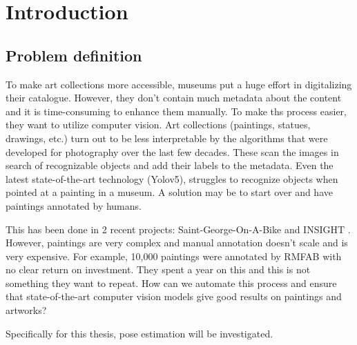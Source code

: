 \chapter{Introduction}
\label{chap:intro}

\section{Problem definition}

To make art collections more accessible, museums put a huge effort in digitalizing their catalogue.
However, they don't contain much metadata about the content and it is time-consuming to enhance them manually.
To make ths process easier, they want to utilize computer vision.
Art collections (paintings, statues, drawings, etc.) turn out to be less interpretable by the algorithms that were developed for photography over the last few decades.
These scan the images in search of recognizable objects and add their labels to the metadata.
Even the latest state-of-the-art technology (Yolov5), struggles to recognize objects when pointed at a painting in a museum.  
A solution may be to start over and have paintings annotated by humans.  
  
This has been done in 2 recent projects:  Saint-George-On-A-Bike \cite{GeorgeOnABike} and INSIGHT \cite{Insight}.
However, paintings are very complex and manual annotation doesn't scale and is very expensive.
For example, 10,000 paintings were annotated by \gls{RMFAB} with no clear return on investment.
They spent a year on this and this is not something they want to repeat.
How can we automate this process and ensure that state-of-the-art computer vision models give good results on paintings and artworks?  
  
Specifically for this thesis, pose estimation will be investigated.

